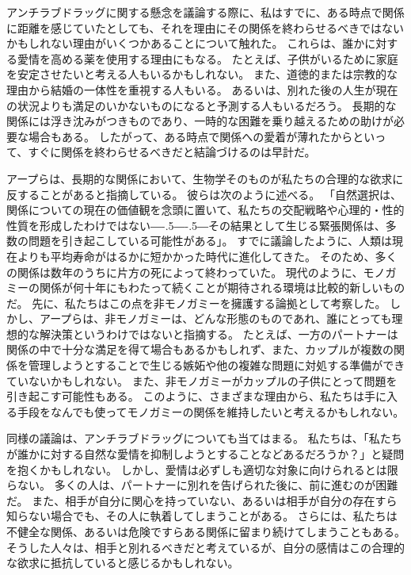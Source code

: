\documentclass[paper=a4,book,openany]{jlreq}
\def\DDASH{―\kern-.5\zw―\kern-.5\zw―} %
\begin{document}
アンチラブドラッグに関する懸念を議論する際に、私はすでに、ある時点で関係に距離を感じていたとしても、それを理由にその関係を終わらせるべきではないかもしれない理由がいくつかあることについて触れた。
これらは、誰かに対する愛情を高める薬を使用する理由にもなる。
たとえば、子供がいるために家庭を安定させたいと考える人もいるかもしれない。
また、道徳的または宗教的な理由から結婚の一体性を重視する人もいる。
あるいは、別れた後の人生が現在の状況よりも満足のいかないものになると予測する人もいるだろう。
長期的な関係には浮き沈みがつきものであり、一時的な困難を乗り越えるための助けが必要な場合もある。
したがって、ある時点で関係への愛着が薄れたからといって、すぐに関係を終わらせるべきだと結論づけるのは早計だ。

アープらは、長期的な関係において、生物学そのものが私たちの合理的な欲求に反することがあると指摘している。
彼らは次のように述べる。
「自然選択は、関係についての現在の価値観を念頭に置いて、私たちの交配戦略や心理的・性的性質を形成したわけではない{\DDASH}その結果として生じる緊張関係は、多数の問題を引き起こしている可能性がある」\citep[p.567]{earp12:_natur_selec_child_ethic_marriag_divor}。
すでに議論したように、人類は現在よりも平均寿命がはるかに短かかった時代に進化してきた。
そのため、多くの関係は数年のうちに片方の死によって終わっていた。
現代のように、モノガミーの関係が何十年にもわたって続くことが期待される環境は比較的新しいものだ。
先に、私たちはこの点を非モノガミーを擁護する論拠として考察した。
しかし、アープらは、非モノガミーは、どんな形態のものであれ、誰にとっても理想的な解決策というわけではないと指摘する。
たとえば、一方のパートナーは関係の中で十分な満足を得て場合もあるかもしれず、また、カップルが複数の関係を管理しようとすることで生じる嫉妬や他の複雑な問題に対処する準備ができていないかもしれない。
また、非モノガミーがカップルの子供にとって問題を引き起こす可能性もある\citep[p.48]{earp20:_love_drugs}。
このように、さまざまな理由から、私たちは手に入る手段をなんでも使ってモノガミーの関係を維持したいと考えるかもしれない。

同様の議論は、アンチラブドラッグについても当てはまる。
私たちは、「私たちが誰かに対する自然な愛情を抑制しようとすることなどあるだろうか？」と疑問を抱くかもしれない。
しかし、愛情は必ずしも適切な対象に向けられるとは限らない。
多くの人は、パートナーに別れを告げられた後に、前に進むのが困難だ。
また、相手が自分に関心を持っていない、あるいは相手が自分の存在すら知らない場合でも、その人に執着してしまうことがある。
さらには、私たちは不健全な関係、あるいは危険ですらある関係に留まり続けてしまうこともある。
そうした人々は、相手と別れるべきだと考えているが、自分の感情はこの合理的な欲求に抵抗していると感じるかもしれない。
\end{document}
